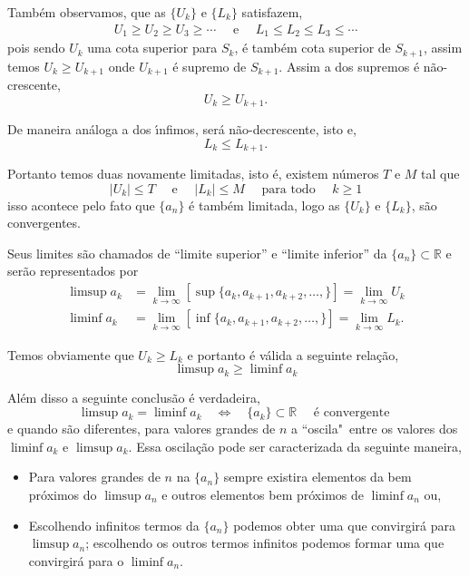 Tamb\'{e}m observamos, que as \seqs $\{U_k\}$ e $\{L_k\}$ satisfazem,
\begin{align*}
    U_1\geq U_2\geq U_3\geq \cdots\quad \text{ e }\quad L_1\leq L_2\leq L_3\leq \cdots
\end{align*}
pois sendo $U_k$ uma cota superior para $S_k$, \'{e} tamb\'{e}m cota superior de $S_{k+1}$, assim temos $U_k\geq U_{k+1}$ onde $U_{k+1}$ \'{e}
supremo de $S_{k+1}$. Assim a \seq dos supremos \'{e} n\~{a}o-crescente,
$$
U_{k}\geq U_{k+1}.
$$

De maneira an\'{a}loga a \seq dos \'{\i}nfimos, ser\'{a} n\~{a}o-decrescente, isto e,
$$
L_{k}\leq L_{k+1}.
$$

Portanto temos duas \seqs novamente limitadas, isto \'{e}, existem n\'{u}meros $T$ e $M$ tal que
\begin{equation*}
    |U_k|\leq T \quad \text{ e }\quad |L_k|\leq M\quad \text{ para todo }\quad k\geq 1
\end{equation*}
isso acontece pelo fato que \seq  $\{a_n\}$ \'{e} tamb\'{e}m limitada, logo as \seqs $\{U_k\}$ e $\{L_k\}$, s\~{a}o convergentes.

Seus limites s\~{a}o chamados de ``limite superior'' e ``limite inferior'' da \seq $\{a_n\}\subset \mathbb{R}$ e ser\~{a}o representados por
\begin{align*}
    \limsup a_k&=\lim_{k\to\infty}[\sup\{a_k, a_{k+1}, a_{k+2},\ldots,  \}]
    =\lim_{k\to\infty} U_{k}\\[2ex]
    \liminf a_k&=\lim_{k\to\infty}[\inf\{a_k, a_{k+1}, a_{k+2},\ldots,  \}]
    =\lim_{k\to\infty}L_{k}.
\end{align*}

Temos obviamente que $U_k\geq L_k$ e portanto \'{e} v\'{a}lida a seguinte rela\c{c}\~{a}o,
\begin{equation*}
    \limsup a_k\geq \liminf a_k
\end{equation*}

Al\'{e}m disso a seguinte conclus\~{a}o \'{e} verdadeira,
\begin{equation*}
    \limsup a_k=\liminf a_k\quad \Leftrightarrow\quad \{a_k\}\subset \mathbb{R}\quad \text{ \'{e} convergente }
\end{equation*}
e quando s\~{a}o diferentes, para valores grandes de $n$ a \seq ``oscila"\  entre os valores dos $\liminf a_k$ e $\limsup a_k$. Essa
oscila\c{c}\~{a}o pode ser caracterizada da seguinte maneira,
\begin{itemize}
  \item Para valores grandes de $n$ na \seq $\{a_n\}$ sempre existira elementos da \seq bem pr\'{o}ximos do $\limsup a_n$ e outros elementos
  bem pr\'{o}ximos de $\liminf a_n$ ou,
  \item Escolhendo infinitos termos da \seq $\{a_n\}$ podemos obter uma \seq que convirgir\'{a} para $\limsup a_n$; escolhendo os outros termos infinitos podemos formar uma \seq que convirgir\'{a} para o $\liminf a_n$.
\end{itemize}

